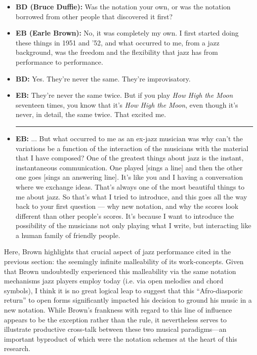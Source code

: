         \begin{smallquote}
            \begin{itemize}
                \item \textbf{BD (Bruce Duffie):} Was the notation your own, or was the notation borrowed from other people that discovered it first?
                \item \textbf{EB (Earle Brown):} No, it was completely my own. I first started doing these things in 1951 and '52, and what occurred to me, from a jazz background, was the freedom and the flexibility that jazz has from performance to performance.
                \item \textbf{BD:} Yes. They're never the same. They're improvisatory.
                \item \textbf{EB:} They're never the same twice. But if you play \textit{How High the Moon} seventeen times, you know that it's \textit{How High the Moon}, even though it's never, in detail, the same twice. That excited me.

                \centering
                    \noindent\rule{2cm}{0.4pt}
                    
                \justifying
                \item \textbf{EB:} ... But what occurred to me as an ex-jazz musician was why can't the variations be a function of the interaction of the musicians with the material that I have composed? One of the greatest things about jazz is the instant, instantaneous communication.  One played [sings a line] and then the other one goes [sings an answering line].  It’s like you and I having a conversation where we exchange ideas.  That’s always one of the most beautiful things to me about jazz.  So that’s what I tried to introduce, and this goes all the way back to your first question — why new notation, and why the scores look different than other people’s scores.  It’s because I want to introduce the possibility of the musicians not only playing what I write, but interacting like a human family of friendly people.\autocite{Duffie}
            \end{itemize}
        \end{smallquote}


    \noindent Here, Brown highlights that crucial aspect of jazz performance cited in the previous section: the seemingly infinite malleability of its work-concepts. Given that Brown undoubtedly experienced this malleability via the same notation mechanisms jazz players employ today (i.e. via open melodies and chord symbols), I think it is no great logical leap to suggest that this ``Afro-diasporic return'' to open forms significantly impacted his decision to ground his music in a new notation. While Brown's frankness with regard to this line of influence appears to be the exception rather than the rule, it nevertheless serves to illustrate productive cross-talk between these two musical paradigms---an important byproduct of which were the notation schemes at the heart of this research.


